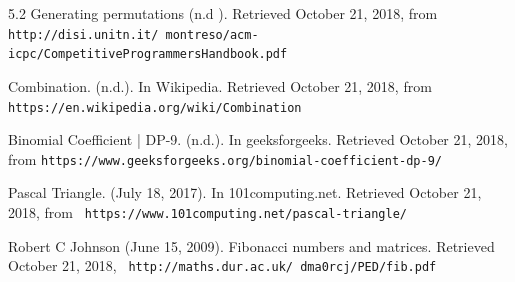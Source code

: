 \documentclass[12pt]{article}
\begin{document}
\begin{thebibliography}{9}
5.2 Generating permutations (n.d ). Retrieved October 21, 2018, from \texttt{ http://disi.unitn.it/~montreso/acm-icpc/CompetitiveProgrammersHandbook.pdf }

Combination. (n.d.). In Wikipedia. Retrieved October 21, 2018, from \texttt{https://en.wikipedia.org/wiki/Combination}

Binomial Coefficient | DP-9. (n.d.). In geeksforgeeks. Retrieved October 21, 2018, from \texttt{https://www.geeksforgeeks.org/binomial-coefficient-dp-9/}

Pascal Triangle. (July 18, 2017). In 101computing.net. Retrieved October 21, 2018, from \texttt{ https://www.101computing.net/pascal-triangle/ }

Robert C Johnson (June 15, 2009). Fibonacci numbers and matrices. Retrieved October 21, 2018,  \texttt{ http://maths.dur.ac.uk/~dma0rcj/PED/fib.pdf}

\end{thebibliography}
\end{document}
